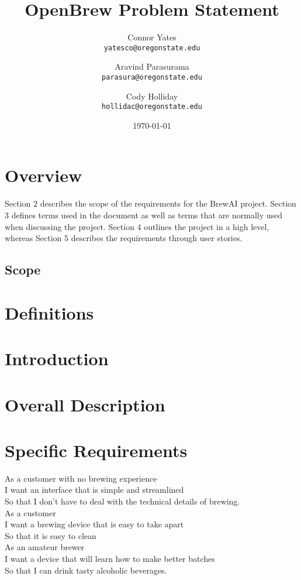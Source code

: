 \documentclass[letterpaper,10pt]{article}
\author{Connor Yates\\
\texttt{yatesco@oregonstate.edu}
\and
Aravind Parasurama\\
\texttt{parasura@oregonstate.edu}
\and
Cody Holliday\\
\texttt{hollidac@oregonstate.edu}}
\date{\today}
\title{OpenBrew Problem Statement}
\begin{document}
\maketitle

\newpage

\section{Overview}
Section 2 describes the scope of the requirements for the BrewAI project.
Section 3 defines terms used in the document as well as terms that are normally used when discussing the project.
Section 4 outlines the project in a high level, whereas Section 5 describes the requirements through user stories.

\subsection{Scope}


\section{Definitions}

\section{Introduction}
\section{Overall Description}


\section{Specific Requirements}
As a customer with no brewing experience\\
I want an interface that is simple and streamlined\\
So that I don't have to deal with the technical details of brewing.\\

As a customer\\
I want a brewing device that is easy to take apart\\
So that it is easy to clean\\

As an amateur brewer\\
I want a device that will learn how to make better batches\\
So that I can drink tasty alcoholic beverages.\\
\end{document}
